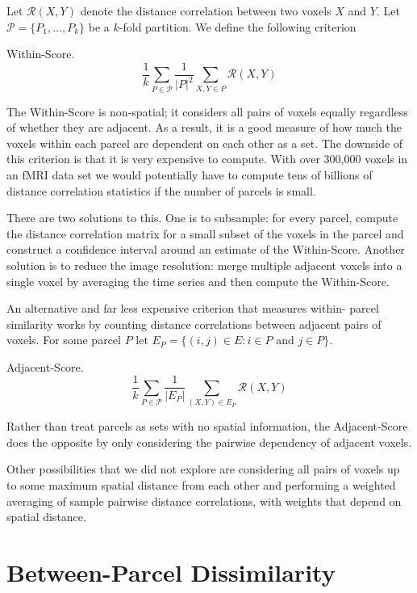 Let $\mathcal{R}(X,Y)$ denote the distance correlation between two
voxels $X$ and $Y$. Let $\mathcal{P} = \{P_1, ..., P_k\}$ be a $k$-fold partition. We define the following criterion

\begin{definition} \label{within-score}
Within-Score.
\[ \frac{1}{k} \sum_{P \in \mathcal{P}}
   \frac{1}{|P|^2} \sum_{X,Y \in P} \mathcal{R}(X,Y)
\]
\end{definition}

The Within-Score is non-spatial; it considers all pairs of voxels
equally regardless of whether they are adjacent. As a result, it is a
good measure of how much the voxels within each parcel are dependent on
each other as a set. The downside of this criterion is that it is very
expensive to compute. With over 300,000 voxels in an fMRI data set we
would potentially have to compute tens of billions of distance
correlation statistics if the number of parcels is small.

There are two solutions to this. One is to subsample: for every parcel,
compute the distance correlation matrix for a small subset of the voxels
in the parcel and construct a confidence interval around an estimate of
the Within-Score. Another solution is to reduce the image resolution:
merge multiple adjacent voxels into a single voxel by averaging the time
series and then compute the Within-Score.

An alternative and far less expensive criterion that measures within-
parcel similarity works by counting distance correlations between
adjacent pairs of voxels. For some parcel $P$ let
$E_P = \{ (i,j) \in E : i \in P \text{ and } j \in P \}$.

\begin{definition} \label{adjacent-score}
Adjacent-Score.
\[ \frac{1}{k} \sum_{P \in \mathcal{P}}
   \frac{1}{|E_P|} \sum_{(X,Y) \in E_P} \mathcal{R}(X,Y)
\]
\end{definition}

Rather than treat parcels as sets with no spatial information, the
Adjacent-Score does the opposite by only considering the pairwise
dependency of adjacent voxels.

Other possibilities that we did not explore are considering all pairs
of voxels up to some maximum spatial distance from each other and
performing a weighted averaging of sample pairwise distance
correlations, with weights that depend on spatial distance.

\section{Between-Parcel Dissimilarity}

